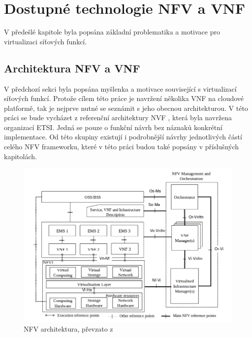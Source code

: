 \chapter{Dostupné technologie NFV a VNF}

V předešlé kapitole byla popsána základní problematika a motivace pro virtualizaci síťových funkcí.

\section{Architektura NFV a VNF} 

V předchozí sekci byla popsána myšlenka a motivace související s virtualizací síťových funkcí. Protože cílem této práce je navržení několika VNF na cloudové platformě, tak je nejprve nutné se seznámit s jeho obecnou architekturou. V této práci se bude vycházet z referenční architektury NVF \cite{NFV_architektura}, která byla navržena organizací ETSI. Jedná se pouze o funkční návrh bez náznaků konkrétní implementace. Od této skupiny existují i podrobnější návrhy jednotlivých částí celého NFV frameworku, které v této práci budou také popsány v příslušných kapitolách.

\begin{figure}[h]
\begin{centering}
\includegraphics[scale=0.5]{images/NFV_architektura}
\par\end{centering}
\caption{NFV architektura, převzato z \cite{NFV_architektura}\label{fig:NFV_architektura}}
\end{figure}

